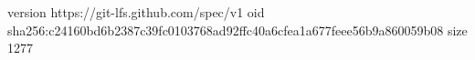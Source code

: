 version https://git-lfs.github.com/spec/v1
oid sha256:c24160bd6b2387c39fc0103768ad92ffc40a6cfea1a677feee56b9a860059b08
size 1277

